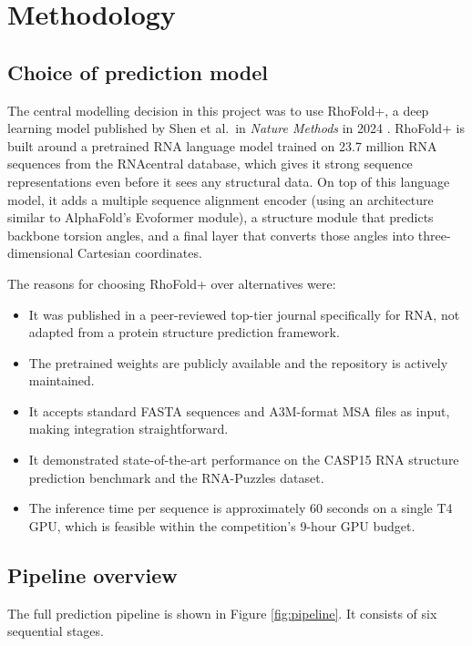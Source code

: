 \documentclass[11pt,a4paper]{article}
\begin{document}
\section{Methodology}

\subsection{Choice of prediction model}

The central modelling decision in this project was to use RhoFold+, a deep learning model published by Shen et al.\ in \textit{Nature Methods} in 2024 \cite{shen2024}. RhoFold+ is built around a pretrained RNA language model trained on 23.7 million RNA sequences from the RNAcentral database, which gives it strong sequence representations even before it sees any structural data. On top of this language model, it adds a multiple sequence alignment encoder (using an architecture similar to AlphaFold's Evoformer module), a structure module that predicts backbone torsion angles, and a final layer that converts those angles into three-dimensional Cartesian coordinates.

The reasons for choosing RhoFold+ over alternatives were:

\begin{itemize}
    \item It was published in a peer-reviewed top-tier journal specifically for RNA, not adapted from a protein structure prediction framework.
    \item The pretrained weights are publicly available and the repository is actively maintained.
    \item It accepts standard FASTA sequences and A3M-format MSA files as input, making integration straightforward.
    \item It demonstrated state-of-the-art performance on the CASP15 RNA structure prediction benchmark and the RNA-Puzzles dataset.
    \item The inference time per sequence is approximately 60 seconds on a single T4 GPU, which is feasible within the competition's 9-hour GPU budget.
\end{itemize}

\subsection{Pipeline overview}

The full prediction pipeline is shown in Figure \ref{fig:pipeline}. It consists of six sequential stages.
\end{document}
